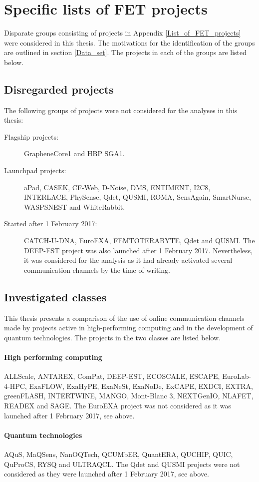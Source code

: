 \chapter{Specific lists of FET projects} \label{Specific_lists_of_FET_projects}
Disparate groups consisting of projects in Appendix \ref{List_of_FET_projects} were considered in this thesis. The motivations for the identification of the groups are outlined in section \ref{Data_set}. The projects in each of the groups are listed below.

\section{Disregarded projects}
The following groups of projects were not considered for the analyses in this thesis:

\begin{description}
 \item [Flagship projects:] GrapheneCore1 and HBP SGA1.
 \item [Launchpad projects:] aPad, CASEK, CF-Web, D-Noise, DMS, ENTIMENT, I2C8, INTERLACE, PhySense, Qdet, QUSMI, ROMA, SensAgain, SmartNurse, WASPSNEST and WhiteRabbit.
 \item [Started after 1 February 2017:] CATCH-U-DNA, EuroEXA, FEMTOTERABYTE, Qdet and QUSMI. The DEEP-EST project was also launched after 1 February 2017. Nevertheless, it was considered for the analysis as it had already activated several communication channels by the time of writing.
\end{description}

\section{Investigated classes}
This thesis presents a comparison of the use of online communication channels made by projects active in high-performing computing and in the development of quantum technologies. The projects in the two classes are listed below. 

\subsubsection{High performing computing}
ALLScale, ANTAREX, ComPat, DEEP-EST, ECOSCALE, ESCAPE, EuroLab-4-HPC, ExaFLOW, ExaHyPE, ExaNeSt, ExaNoDe, ExCAPE, EXDCI, EXTRA, greenFLASH, INTERTWINE, MANGO, Mont-Blanc 3, NEXTGenIO, NLAFET, READEX and SAGE. The  EuroEXA project was not considered as it was launched after 1 February 2017, see above.

\subsubsection{Quantum technologies}
AQuS, MaQSens, NanOQTech, QCUMbER, QuantERA, QUCHIP, QUIC, QuProCS, RYSQ and ULTRAQCL. The Qdet and QUSMI projects were not considered as they were launched after 1 February 2017, see above.